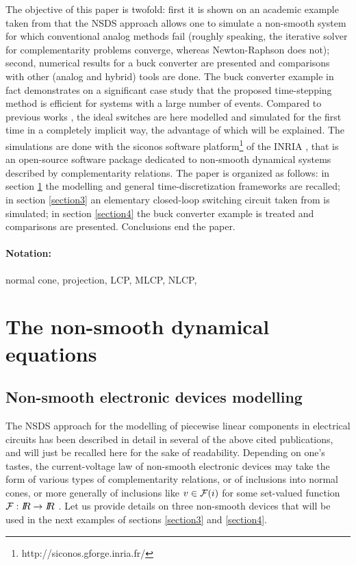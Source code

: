 \documentclass{article}
\newcommand{\RR}{\mbox{\rm $I\!\!R$}}
\begin{document}
The objective of this paper is twofold: first it is shown on an academic example taken from \cite{maffezzoni2006} that the NSDS approach allows one to simulate a non-smooth system for which conventional analog methods fail (roughly speaking, the iterative solver for complementarity problems converge, whereas Newton-Raphson does not); second, numerical results for a buck converter are presented and comparisons with other (analog and hybrid) tools are done. The buck converter example in fact demonstrates on a significant case study that the proposed time-stepping method is efficient for systems with a large number of events. Compared to previous works \cite{glocker2005,vasca2009}, the ideal switches are here modelled and simulated for the first time in a completely implicit way, the advantage of which will be explained.  The simulations are done with the {\sc siconos} software platform\footnote{http://siconos.gforge.inria.fr/} of the INRIA \cite{acary-brogliato2008,Acary-Perignon2007,mathmod}, that is an open-source software package dedicated to non-smooth dynamical systems described by complementarity relations. The paper is organized as follows: in section \ref{section2} the modelling and general time-discretization frameworks are recalled; in section \ref{section3} an elementary closed-loop switching circuit taken from \cite{maffezzoni2006} is simulated; in section \ref{section4} the buck converter example is treated and comparisons are presented. Conclusions end the paper. 



\paragraph{Notation:} normal cone, projection, LCP, MLCP, NLCP,




\section{The non-smooth dynamical equations}
\label{section2}

\subsection{Non-smooth electronic devices modelling}
\label{section21}

The NSDS approach for the  modelling of piecewise linear components in electrical circuits has been described in detail  in several of the above cited publications, and will just be recalled here for the sake of readability. Depending on one's tastes, the current-voltage law of non-smooth electronic devices may take the form of various types of complementarity relations, or of inclusions into normal cones, or more generally of inclusions like $v \in {\cal F}(i)$ for some set-valued function ${\cal F}: \RR \rightarrow \RR$ \cite{adly2007,glocker2005}. Let us provide details on three non-smooth devices that will be used in the next examples of sections \ref{section3} and \ref{section4}. 
\end{document}
